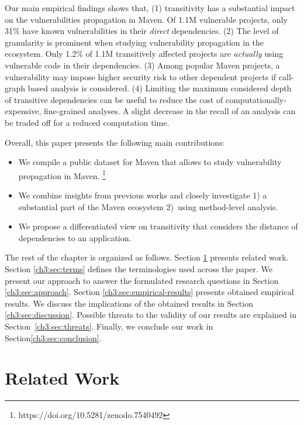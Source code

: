 Our main empirical findings shows that, (1) transitivity has a substantial impact on the vulnerabilities propagation in Maven.
Of 1.1M vulnerable projects, only 31\% have known vulnerabilities in their \textit{direct} dependencies.
(2) The level of granularity is prominent when studying vulnerability propagation in the ecosystem.
Only 1.2\% of 1.1M transitively affected projects are \textit{actually} using vulnerable code in their dependencies.
(3) Among popular Maven projects, a vulnerability may impose higher security risk to other dependent projects if call-graph based analysis is considered.
(4) Limiting the maximum considered depth of transitive dependencies can be useful to reduce the cost of computationally-expensive, fine-grained analyses.
A slight decrease in the recall of an analysis can be traded off for a reduced computation time.

\smallskip
\noindent
Overall, this paper presents the following main contributions:
\begin{itemize}
\item We compile a public dataset for Maven that allows to study vulnerability propagation in Maven.%
\footnote{https://doi.org/10.5281/zenodo.7540492}
\item We combine insights from previous works and closely investigate 1) a substantial part of the Maven ecosystem 2)~using method-level analysis.
\item We propose a differentiated view on transitivity that considers the distance of dependencies to an application. 
\end{itemize}

The rest of the chapter is organized as follows. Section \ref{ch3:sec:related-work} presents related work. Section \ref{ch3:sec:terms} defines the terminologies used across the paper. We present our approach to answer the formulated research questions in Section \ref{ch3:sec:approach}. Section \ref{ch3:sec:empirical-results} presents obtained empirical results. We discuss the implications of the obtained results in Section \ref{ch3:sec:discussion}. Possible threats to the validity of our results are explained in Section~\ref{ch3:sec:threats}. Finally, we conclude our work in Section\ref{ch3:sec:conclusion}.

\newpage

\section{Related Work}\label{ch3:sec:related-work}
